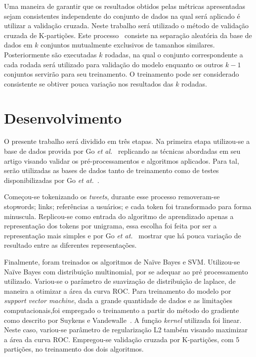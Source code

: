 Uma maneira de garantir que os resultados obtidos pelas métricas apresentadas sejam consistentes independente do
conjunto de dados na qual será aplicado é utilizar a validação cruzada.
Neste trabalho será utilizado o método de validação cruzada de K-partições.
Este processo~\cite{kohavi95} consiste na separação aleatória da base de dados em $k$ conjuntos mutualmente exclusivos
de tamanhos similares.
Posteriormente são executadas $k$ rodadas, na qual o conjunto correspondente a cada rodada será utilizado para validação
do modelo enquanto os outros $k-1$ conjuntos servirão para seu treinamento.
O treinamento pode ser considerado consistente se obtiver pouca variação nos resultados das $k$ rodadas.

\section{Desenvolvimento} \label{sec:desenvolvimento}

O presente trabalho será dividido em três etapas.
Na primeira etapa utilizou-se a base de dados provida por Go \textit{et al.}~\cite{go09} replicando as técnicas
abordadas em seu artigo visando validar os pré-processamentos e algoritmos aplicados.
Para tal, serão utilizadas as bases de dados tanto de treinamento como de testes disponibilizadas por Go
\textit{et at.}~\cite{go09}.

Começou-se tokenizando os \textit{tweets}, durante esse processo removeram-se stopwords; links; referências a usuários;
e cada token foi transformado para forma minuscula.
Replicou-se como entrada do algoritmo de aprendizado apenas a representação dos tokens por unigrama, essa escolha foi
feita por ser a representação mais simples e por Go \textit{et at.}~\cite{go09} mostrar que há pouca variação de
resultado entre as diferentes representações.

Finalmente, foram treinados os algoritmos de Naïve Bayes e SVM.
Utilizou-se Naïve Bayes com distribuição multinomial, por se adequar ao pré processamento utilizado.
Variou-se o parâmetro de suavização de distribuição de laplace, de maneira a otimizar a área da curva ROC.
Para treinamento do modelo por \textit{support vector machine}, dada a grande quantidade de dados e as limitações
computacionais,foi empregado o treinamento a partir do método do gradiente como descrito por Suykens e
Vandewalle~\cite{suykens99}.
A função \textit{kernel} utilizada foi linear.
Neste caso, variou-se parâmetro de regularização L2 também visando maximizar a área da curva ROC.
Empregou-se validação cruzada por K-partições, com 5 partições, no treinamento dos dois algoritmos.

